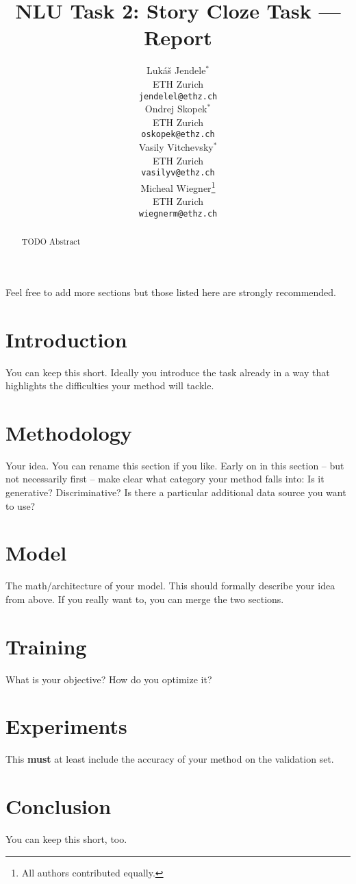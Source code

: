 \documentclass{article}
\title{NLU Task 2: Story Cloze Task --- Report}
\author{
  Luk\'{a}\v{s} Jendele$^\ast$\\
  ETH Zurich\\
  \texttt{jendelel@ethz.ch}\\
  \And
  Ondrej Skopek$^\ast$\\
  ETH Zurich\\
  \texttt{oskopek@ethz.ch}\\
  \And
  Vasily Vitchevsky$^\ast$\\
  ETH Zurich\\
  \texttt{vasilyv@ethz.ch}\\
  \And
  Micheal Wiegner\thanks{All authors contributed equally.}\\
  ETH Zurich\\
  \texttt{wiegnerm@ethz.ch}\\
}
\begin{document}
\maketitle

\begin{abstract}
TODO Abstract
\end{abstract}

Feel free to add more sections but those listed here are strongly recommended.

\section{Introduction}\label{sec:intro}
You can keep this short.
Ideally you introduce the task already in a way that highlights the difficulties your method will tackle.\citep{StoryCloze}

\section{Methodology}\label{sec:methodology}
Your idea.
You can rename this section if you like.
Early on in this section -- but not necessarily first -- make clear what category your method falls into: Is it generative?
Discriminative?
Is there a particular additional data source you want to use?

\section{Model}\label{sec:model}
The math/architecture of your model.
This should formally describe your idea from above.
If you really want to, you can merge the two sections.

\section{Training}\label{sec:training}
What is your objective?
How do you optimize it?

\section{Experiments}\label{sec:experiments}
This \textbf{must} at least include the accuracy of your method on the validation set.

\section{Conclusion}\label{sec:conclusion}
You can keep this short, too.


\end{document}
